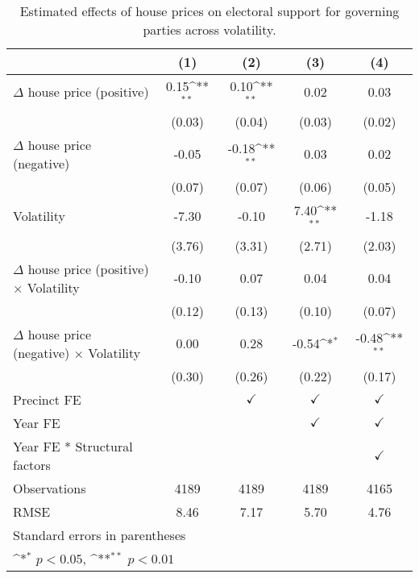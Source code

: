 \begin{table}[htbp]\centering
\def\sym#1{\ifmmode^{#1}\else\(^{#1}\)\fi}
\caption{Estimated effects of house prices on electoral support for governing parties across volatility.} \label{tab6}
\begin{tabular}{l*{4}{c}}
\hline\hline
                    &\multicolumn{1}{c}{(1)}        &\multicolumn{1}{c}{(2)}        &\multicolumn{1}{c}{(3)}        &\multicolumn{1}{c}{(4)}        \\
\hline
$\Delta$ house price (positive)&        0.15\sym{**}&        0.10\sym{**}&        0.02        &        0.03        \\
                    &      (0.03)        &      (0.04)        &      (0.03)        &      (0.02)        \\
[1em]
$\Delta$ house price (negative)&       -0.05        &       -0.18\sym{**}&        0.03        &        0.02        \\
                    &      (0.07)        &      (0.07)        &      (0.06)        &      (0.05)        \\
[1em]
Volatility          &       -7.30        &       -0.10        &        7.40\sym{**}&       -1.18        \\
                    &      (3.76)        &      (3.31)        &      (2.71)        &      (2.03)        \\
[1em]
$\Delta$ house price (positive) $\times$ Volatility&       -0.10        &        0.07        &        0.04        &        0.04        \\
                    &      (0.12)        &      (0.13)        &      (0.10)        &      (0.07)        \\
[1em]
$\Delta$ house price (negative) $\times$ Volatility&        0.00        &        0.28        &       -0.54\sym{*} &       -0.48\sym{**}\\
                    &      (0.30)        &      (0.26)        &      (0.22)        &      (0.17)        \\
[1em]
\hline Precinct FE  &                    &$\checkmark$        &$\checkmark$        &$\checkmark$        \\
[1em]
Year FE             &                    &                    &$\checkmark$        &$\checkmark$        \\
[1em]
Year FE * Structural factors&                    &                    &                    &$\checkmark$        \\
\hline
Observations        &        4189        &        4189        &        4189        &        4165        \\
RMSE                &        8.46        &        7.17        &        5.70        &        4.76        \\
\hline\hline
\multicolumn{5}{l}{\footnotesize Standard errors in parentheses}\\
\multicolumn{5}{l}{\footnotesize \sym{*} \(p<0.05\), \sym{**} \(p<0.01\)}\\
\end{tabular}
\end{table}
